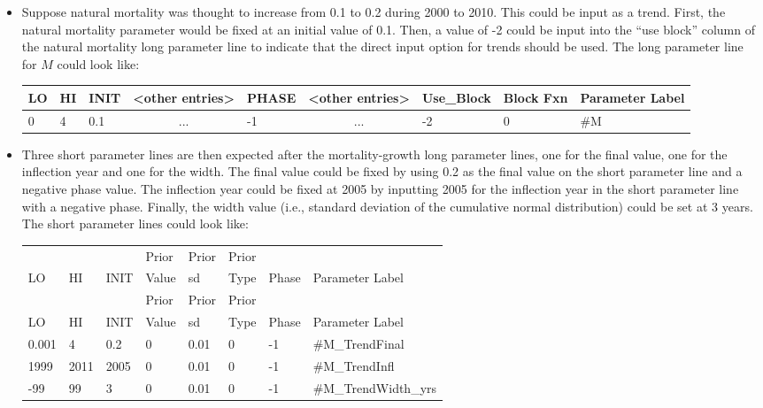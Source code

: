 \begin{itemize}
	\item Suppose natural mortality was thought to increase from 0.1 to 0.2 during 2000 to 2010. This could be input as a trend. First, the natural mortality parameter would be fixed at an initial value of 0.1. Then, a value of -2 could be input into the ``use block'' column of the natural mortality long parameter line to indicate that the direct input option for trends should be used. The long parameter line for $M$ could look like:
	\begin{center}
		\begin{longtable}{p{1cm} p{1cm} p{1cm} p{1.5cm} p{1cm} p{1.5cm} p{1.5cm} p{1.5cm} p{3cm}}
			
			\hline
			LO \Tstrut & HI & INIT & <other entries> & PHASE & <other entries> & Use\_Block & Block Fxn & Parameter Label \Bstrut\\
			\hline
			0          & 4 & 0.1 & \multicolumn{1}{c}{...} & -1 & \multicolumn{1}{c}{...} & -2 & 0 & \#M \Bstrut\\
			\hline
		\end{longtable}
	\end{center}

	\item Three short parameter lines are then expected after the mortality-growth long parameter lines, one for the final value, one for the inflection year and one for the width. The final value could be fixed by using 0.2 as the final value on the short parameter line and a negative phase value. The inflection year could be fixed at 2005 by inputting 2005 for the inflection year in the short parameter line with a negative phase. Finally, the width value (i.e., standard deviation of the cumulative normal distribution) could be set at 3 years. The short parameter lines could look like:
	
	\begin{longtable}{p{0.7cm} p{0.7cm} p{0.7cm} p{1cm} p{1.4cm} p{1cm} p{1cm} p{6.7cm}}
	\hline
	   &    &      & Prior & Prior    & Prior &  & \Tstrut\\
	LO & HI & INIT & Value & \gls{sd} & Type  & Phase & Parameter Label \Bstrut\\
	\hline
	\endfirsthead
	
	\hline
	   &    &      & Prior & Prior    & Prior &  & \Tstrut\\
	LO & HI & INIT & Value & \gls{sd} & Type  & Phase & Parameter Label \Bstrut\\
	\hline
	\endhead
	
	\endfoot
	
	\endlastfoot
	
	0.001 & 4    & 0.2  & 0 & 0.01 & 0 & -1 & \#M\_TrendFinal \Tstrut\\
	1999  & 2011 & 2005 & 0 & 0.01 & 0 & -1 & \#M\_TrendInfl \Bstrut\\
	-99   & 99   & 3    & 0 & 0.01 & 0 & -1 & \#M\_TrendWidth\_yrs \Bstrut\\
	\hline
\end{longtable}
\end{itemize}

